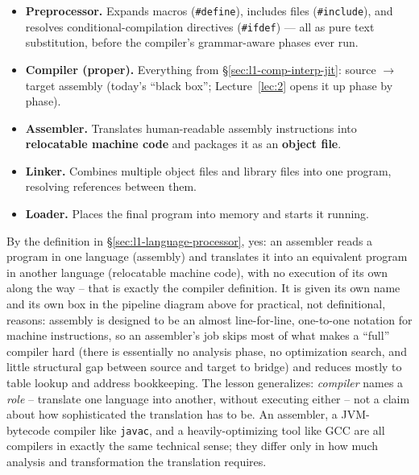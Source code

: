 \documentclass[full-course-notes.tex]{subfiles}
\begin{document}
\begin{itemize}
  \item \textbf{Preprocessor.} Expands macros (\texttt{\#define}), includes files
  (\texttt{\#include}), and resolves conditional-compilation directives (\texttt{\#ifdef}) ---
  all as pure text substitution, before the compiler's grammar-aware phases ever run.
  \item \textbf{Compiler (proper).} Everything from \S\ref{sec:l1-comp-interp-jit}: source
  $\to$ target assembly (today's ``black box''; Lecture~\ref{lec:2} opens it up phase by phase).
  \item \textbf{Assembler.} Translates human-readable assembly instructions into
  \textbf{relocatable machine code} and packages it as an \textbf{object file}.
  \item \textbf{Linker.} Combines multiple object files and library files into one program,
  resolving references between them.
  \item \textbf{Loader.} Places the final program into memory and starts it running.
\end{itemize}

\begin{enrichment}
By the definition in \S\ref{sec:l1-language-processor}, yes: an assembler reads a program in one
language (assembly) and translates it into an equivalent program in another language
(relocatable machine code), with no execution of its own along the way -- that is exactly the
compiler definition. It is given its own name and its own box in the pipeline diagram above for
practical, not definitional, reasons: assembly is designed to be an almost line-for-line,
one-to-one notation for machine instructions, so an assembler's job skips most of what makes a
``full'' compiler hard (there is essentially no analysis phase, no optimization search, and
little structural gap between source and target to bridge) and reduces mostly to table lookup
and address bookkeeping. The lesson generalizes: \emph{compiler} names a \emph{role} -- translate
one language into another, without executing either -- not a claim about how sophisticated the
translation has to be. An assembler, a JVM-bytecode compiler like \texttt{javac}, and a
heavily-optimizing tool like GCC are all compilers in exactly the same technical sense; they
differ only in how much analysis and transformation the translation requires.
\end{enrichment}
\end{document}
